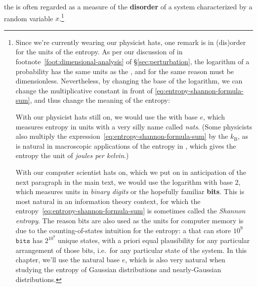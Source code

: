 the  is often regarded as a measure of the \textbf{disorder} of a system characterized by a random variable $x$.\footnote{Since we're currently wearing our physicist hats, one remark is in (dis)order for the units of the entropy. As per our discussion of   in footnote~\ref{foot:dimensional-analysis} of \S\ref{sec:perturbation}, the logarithm of a probability has the same units as the , and for the same reason must be dimensionless. Nevertheless, by changing the base of the logarithm, we can change the multiplicative constant in front of \eqref{eq:entropy-shannon-formula-sum}, and thus change the meaning of the entropy:
\bi
\item With our physicist hats still on, we would use the  with base $e$, which measures entropy in units with a very silly name called \emph{nats}. (Some physicists also multiply the expression~\eqref{eq:entropy-shannon-formula-sum} by the  $k_{\text{B}}$, as is natural in macroscopic applications of the entropy in , which gives the entropy the unit of \emph{joules per kelvin}.)
\item With our computer scientist hats on, which we put on in anticipation of the next paragraph in the main text, we would use the logarithm with base $2$, which measures units in \emph{binary digits} or the hopefully familiar \textbf{bits}. This is most natural in an information theory context, for which the entropy~\eqref{eq:entropy-shannon-formula-sum} is sometimes called the \emph{Shannon entropy}. The reason bits are also used as the units for computer memory is due to the counting-of-states intuition for the entropy: a  that can store $10^9$ $\texttt{bits}$ has $2^{10^9}$ unique states, with a priori equal plausibility for any particular arrangement of those bits, i.e.~for any particular state of the system.
\ei
In this chapter, we'll use the natural base $e$, which is also very natural when studying the entropy of Gaussian distributions and nearly-Gaussian distributions.\label{footnote-entropy-dimensions-nats-vs-bits}
}
